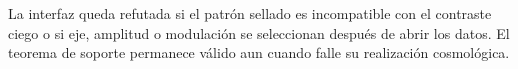 \begin{criterion}
\label{crit:anisotropia-dodecafasica}
La interfaz queda refutada si el patrón sellado es incompatible con el
contraste ciego o si eje, amplitud o modulación se seleccionan después de
abrir los datos. El teorema de soporte permanece válido aun cuando falle su
realización cosmológica.
\end{criterion}
